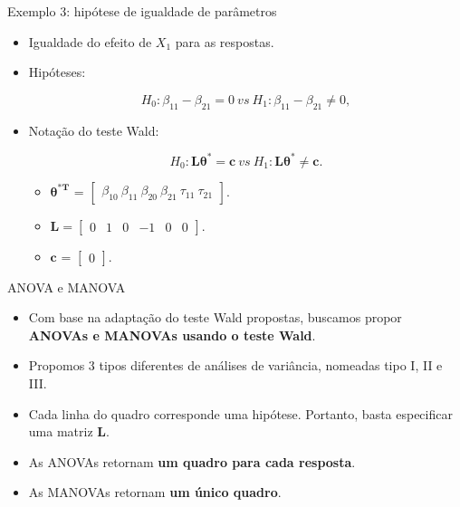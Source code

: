 \documentclass[
  ignorenonframetext,
  serif,
  professionalfont,
  usenames,
  dvipsnames,
  aspectratio = 169]{beamer}
\begin{document}
\begin{frame}{Exemplo 3: hipótese de igualdade de parâmetros}
\protect\hypertarget{exemplo-3-hipuxf3tese-de-igualdade-de-paruxe2metros}{}
\begin{itemize}
  \itemsep 2ex
  
  \item Igualdade do efeito de $X_1$ para as respostas.

  \item Hipóteses:

$$
H_0: \beta_{11} - \beta_{21} = 0 \ vs \ H_1: \beta_{11} - \beta_{21} \neq 0,
$$

  \item Notação do teste Wald:
  
$$H_0: \boldsymbol{L}\boldsymbol{\theta^{*}} = \boldsymbol{c} \ vs \ H_1: \boldsymbol{L}\boldsymbol{\theta^{*}} \neq \boldsymbol{c}.$$  

  \begin{itemize}
  
    \item $\boldsymbol{\theta^{*T}}$ = $\begin{bmatrix} \beta_{10} \  \beta_{11} \ \beta_{20} \ \beta_{21} \ \tau_{11} \ \tau_{21} \end{bmatrix}$.

    \item $\boldsymbol{L} = \begin{bmatrix} 0 & 1 & 0 & -1 & 0 & 0  \end{bmatrix}.$
 
  \item $\boldsymbol{c}$ = $\begin{bmatrix} 0 \end{bmatrix}.$ 

  \end{itemize}
  
\end{itemize}
\end{frame}

\begin{frame}{ANOVA e MANOVA}
\protect\hypertarget{anova-e-manova-1}{}
\begin{itemize}
    \itemsep 2ex

  \item Com base na adaptação do teste Wald propostas, buscamos propor \textbf{ANOVAs e MANOVAs usando o teste Wald}.

  \item Propomos 3 tipos diferentes de análises de variância, nomeadas tipo I, II e III.

  \item Cada linha do quadro corresponde uma hipótese. Portanto, basta especificar uma matriz $\boldsymbol{L}$.

  \item As ANOVAs retornam \textbf{um quadro para cada resposta}.

  \item As MANOVAs retornam \textbf{um único quadro}. 
\end{itemize}
\end{frame}
\end{document}
